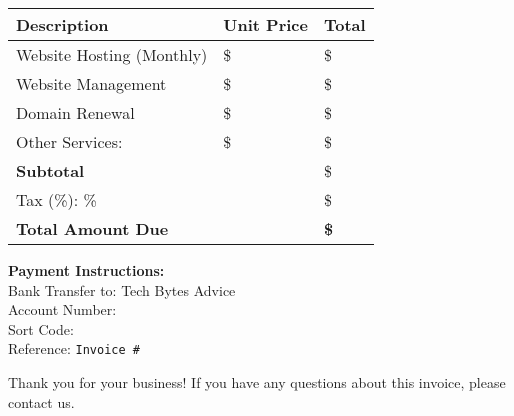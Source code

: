 \documentclass[12pt]{article}
\begin{document}
\begin{longtable}{|p{8cm}|p{3cm}|p{3cm}|}
\hline
\textbf{Description} & \textbf{Unit Price} & \textbf{Total} \\
\hline
Website Hosting (Monthly) & \$\underline{\hspace{1cm}} & \$\underline{\hspace{1cm}} \\
\hline
Website Management & \$\underline{\hspace{1cm}} & \$\underline{\hspace{1cm}} \\
\hline
Domain Renewal & \$\underline{\hspace{1cm}} & \$\underline{\hspace{1cm}} \\
\hline
Other Services: \underline{\hspace{5cm}} & \$\underline{\hspace{1cm}} & \$\underline{\hspace{1cm}} \\
\hline
\textbf{Subtotal} & & \$\underline{\hspace{1cm}} \\
\hline
Tax (\%): \underline{\hspace{1cm}}\% & & \$\underline{\hspace{1cm}} \\
\hline
\textbf{Total Amount Due} & & \textbf{\$ \underline{\hspace{2cm}}} \\
\hline
\end{longtable}

\vspace{2em}

\noindent
\textbf{Payment Instructions:} \\
Bank Transfer to: Tech Bytes Advice \\
Account Number: \underline{\hspace{5cm}} \\
Sort Code: \underline{\hspace{3cm}} \\
Reference: \texttt{Invoice \#\underline{\hspace{2cm}}}

\vspace{2em}

\noindent
Thank you for your business! If you have any questions about this invoice, please contact us.
\end{document}
